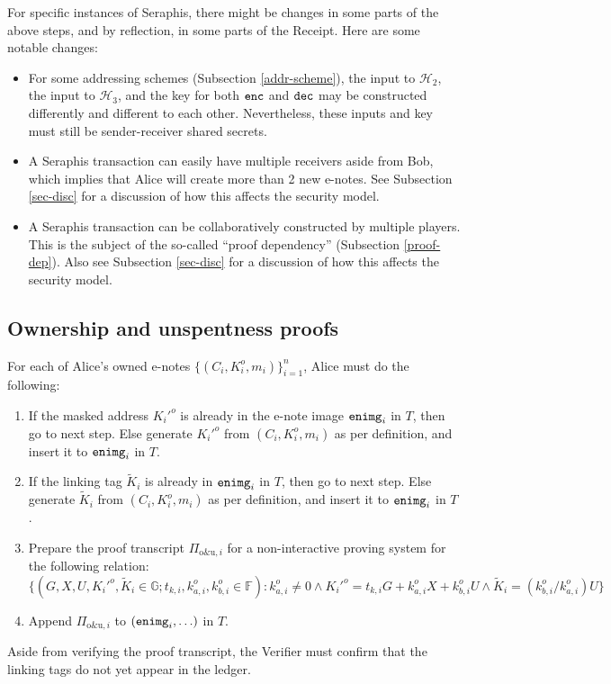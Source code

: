 \documentclass{article}
\begin{document}
For specific instances of Seraphis, there might be changes in some parts of the above steps, and by reflection, in some parts of the Receipt. Here are some notable changes:
\begin{itemize}
\item For some addressing schemes (Subsection \ref{addr-scheme}), the input to $\mathcal{H}_2$, the input to $\mathcal{H}_3$, and the key for both ${\tt enc}$ and ${\tt dec}$ may be constructed differently and different to each other. Nevertheless, these inputs and key must still be sender-receiver shared secrets.
\item A Seraphis transaction can easily have multiple receivers aside from Bob, which implies that Alice will create more than 2 new e-notes. See Subsection \ref{sec-disc} for a discussion of how this affects the security model.
\item A Seraphis transaction can be collaboratively constructed by multiple players. This is the subject of the so-called ``proof dependency'' (Subsection \ref{proof-dep}). Also see Subsection \ref{sec-disc} for a discussion of how this affects the security model.
\end{itemize}

\subsection{Ownership and unspentness proofs}\label{own-unsp}
For each of Alice's owned e-notes $\{(C_i,K_i^o,m_i)\}_{i=1}^n$, Alice must do the following:
\begin{enumerate}
    \item If the masked address $K_i'^o$ is already in the e-note image ${\tt enimg}_i$ in $T$, then go to next step. Else generate $K_i'^o$ from $(C_i, K_i^o, m_i)$ as per definition, and insert it to ${\tt enimg}_i$ in $T$.
    \item If the linking tag $\tilde{K}_i$ is already in ${\tt enimg}_i$ in $T$, then go to next step. Else generate $\tilde{K}_i$ from $(C_i, K_i^o, m_i)$ as per definition, and insert it to ${\tt enimg}_i$ in $T$.
    \item Prepare the proof transcript $\Pi_{\text{o\&u}, i}$ for a non-interactive proving system for the following relation:
$$\{(G, X, U, K_i'^o, \tilde{K}_i\in\mathbb{G}; t_{k,i}, k_{a,i}^o, k_{b,i}^o\in\mathbb{F}): k_{a,i}^o \ne 0 \wedge K_i'^o = t_{k,i} G + k_{a,i}^o X + k_{b,i}^o U \wedge \tilde{K}_i = (k_{b,i}^o/k_{a,i}^o)U \}$$
    \item Append $\Pi_{\text{o\&u}, i}$ to $({\tt enimg}_i, \ldots)$ in $T$.
\end{enumerate}
Aside from verifying the proof transcript, the Verifier must confirm that the linking tags do not yet appear in the ledger.
\end{document}
